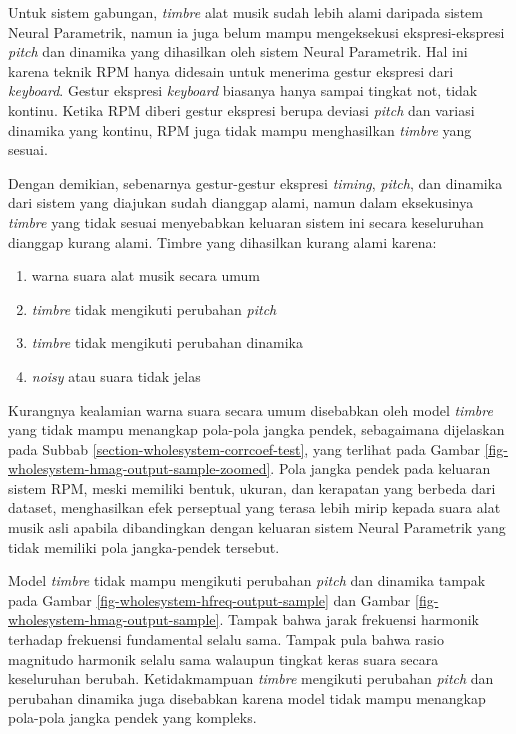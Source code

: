 Untuk sistem gabungan, \textit{timbre} alat musik sudah lebih alami daripada sistem Neural Parametrik, namun ia juga belum mampu mengeksekusi ekspresi-ekspresi \textit{pitch} dan dinamika yang dihasilkan oleh sistem Neural Parametrik. Hal ini karena teknik RPM hanya didesain untuk menerima gestur ekspresi dari \textit{keyboard}. Gestur ekspresi \textit{keyboard} biasanya hanya sampai tingkat not, tidak kontinu. Ketika RPM diberi gestur ekspresi berupa deviasi \textit{pitch} dan variasi dinamika yang kontinu, RPM juga tidak mampu menghasilkan \textit{timbre} yang sesuai.

Dengan demikian, sebenarnya gestur-gestur ekspresi \textit{timing}, \textit{pitch}, dan dinamika dari sistem yang diajukan sudah dianggap alami, namun dalam eksekusinya \textit{timbre} yang tidak sesuai menyebabkan keluaran sistem ini secara keseluruhan dianggap kurang alami. Timbre yang dihasilkan kurang alami karena:

\begin{enumerate}
	\item warna suara alat musik secara umum
	\item \textit{timbre} tidak mengikuti perubahan \textit{pitch}
	\item \textit{timbre} tidak mengikuti perubahan dinamika
	\item \textit{noisy} atau suara tidak jelas
\end{enumerate}



Kurangnya kealamian warna suara secara umum disebabkan oleh model \textit{timbre} yang tidak mampu menangkap pola-pola jangka pendek, sebagaimana dijelaskan pada Subbab \ref{section-wholesystem-corrcoef-test}, yang terlihat pada Gambar \ref{fig-wholesystem-hmag-output-sample-zoomed}. Pola jangka pendek pada keluaran sistem RPM, meski memiliki bentuk, ukuran, dan kerapatan yang berbeda dari dataset, menghasilkan efek perseptual yang terasa lebih mirip kepada suara alat musik asli apabila dibandingkan dengan keluaran sistem Neural Parametrik yang tidak memiliki pola jangka-pendek tersebut.

Model \textit{timbre} tidak mampu mengikuti perubahan \textit{pitch} dan dinamika tampak pada Gambar \ref{fig-wholesystem-hfreq-output-sample} dan Gambar \ref{fig-wholesystem-hmag-output-sample}. Tampak bahwa jarak frekuensi harmonik terhadap frekuensi fundamental selalu sama. Tampak pula bahwa rasio magnitudo harmonik selalu sama walaupun tingkat keras suara secara keseluruhan berubah. Ketidakmampuan \textit{timbre} mengikuti perubahan \textit{pitch} dan perubahan dinamika juga disebabkan karena model tidak mampu menangkap pola-pola jangka pendek yang kompleks.

